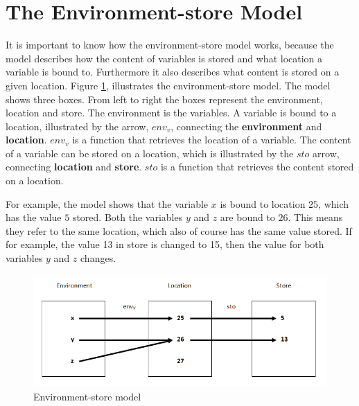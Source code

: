 \section{The Environment-store Model}\label{sec:es-model}
It is important to know how the environment-store model works, because the model describes how the content of variables is stored and what location a variable is bound to. Furthermore it also describes what content is stored on a given location. Figure \ref{fig:esmodel}, illustrates the environment-store model. The model shows three boxes. From left to right the boxes represent the environment, location and store. The environment is the variables. A variable is bound to a location, illustrated by the arrow, $env_v$, connecting the \textbf{environment} and \textbf{location}. $env_v$ is a function that retrieves the location of a variable. The content of a variable can be stored on a location, which is illustrated by the $sto$ arrow, connecting \textbf{location} and \textbf{store}. $sto$ is a function that retrieves the content stored on a location. 

For example, the model shows that the variable $x$ is bound to location $25$, which has the value $5$ stored. Both the variables $y$ and $z$ are bound to $26$. This means they refer to the same location, which also of course has the same value stored. If for example, the value 13 in store is changed to 15, then the value for both variables $y$ and $z$ changes.
\begin{figure}[H]
\includegraphics{billeder/environment_store_model.png}
\caption{Environment-store model}
\label{fig:esmodel}
\end{figure}